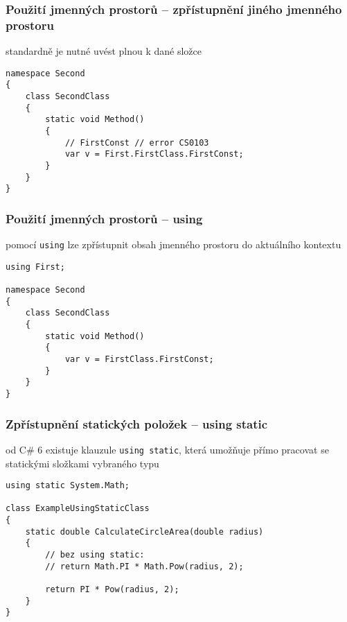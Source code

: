\begin{frame}[fragile]
\frametitle{Použití jmenných prostorů -- zpřístupnění jiného jmenného prostoru}
\vfill
\begin{bitemize}{}
\item standardně je nutné uvést plnou  k dané složce
\end{bitemize}
\vfill
\begin{yesblock}
\begin{lstlisting}
namespace Second
{
    class SecondClass
    {
        static void Method()
        {
            // FirstConst // error CS0103
            var v = First.FirstClass.FirstConst;
        }
    }
}
\end{lstlisting}
\end{yesblock}
\vfill
\end{frame}




\begin{frame}[fragile]
\frametitle{Použití jmenných prostorů -- using}
\vfill
\begin{bitemize}{}
\item pomocí \lstinline|using| lze zpřístupnit obsah jmenného prostoru do aktuálního kontextu
\end{bitemize}
\vfill
\begin{yesblock}
\begin{lstlisting}
using First;

namespace Second
{
    class SecondClass
    {
        static void Method()
        {
            var v = FirstClass.FirstConst;
        }
    }
}
\end{lstlisting}
\end{yesblock}
\vfill
\end{frame}






\begin{frame}[fragile]
\frametitle{Zpřístupnění statických položek -- using static}
\vfill
\begin{bitemize}{}
\item od C\# 6 existuje klauzule \lstinline|using static|, která umožňuje přímo pracovat se statickými složkami vybraného typu
\end{bitemize}
\vfill
\begin{yesblock}
\begin{lstlisting}
using static System.Math;

class ExampleUsingStaticClass
{
    static double CalculateCircleArea(double radius)
    {
        // bez using static:
        // return Math.PI * Math.Pow(radius, 2);
        
        return PI * Pow(radius, 2);
    }
}
\end{lstlisting}
\end{yesblock}
\vfill
\end{frame}